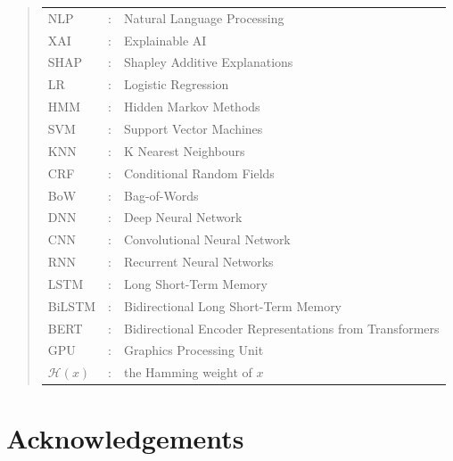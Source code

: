 \documentclass[ %
                    author={Louis Wang},
                supervisor={Dr. Qiang Liu},
                    degree={MSc},
                     title={Identification of Suicide Ideation in Texts},
                      type={},
                      year={2024}]{dissertation}
\begin{document}
\begin{quote}
\noindent
\begin{tabular}{lcl}
      NLP &: & Natural Language Processing \\
      XAI &: & Explainable AI \\
      SHAP &: & Shapley Additive Explanations \\
      LR &: & Logistic Regression \\
      HMM &: & Hidden Markov Methods \\
      SVM &: & Support Vector Machines \\
      KNN &: & K Nearest Neighbours \\
      CRF &: & Conditional Random Fields \\
      BoW &: & Bag-of-Words \\
      DNN &: & Deep Neural Network \\
      CNN &: & Convolutional Neural Network \\
      RNN &: & Recurrent Neural Networks \\
      LSTM &: & Long Short-Term Memory \\
      BiLSTM &: & Bidirectional Long Short-Term Memory \\
      BERT &: & Bidirectional Encoder Representations from Transformers \\
      GPU &: & Graphics Processing Unit \\
      ${\mathcal H}( x )$ &: & the Hamming weight of $x$ \\
\end{tabular}
\end{quote}


\chapter*{Acknowledgements}

\noindent


%
\end{document}
